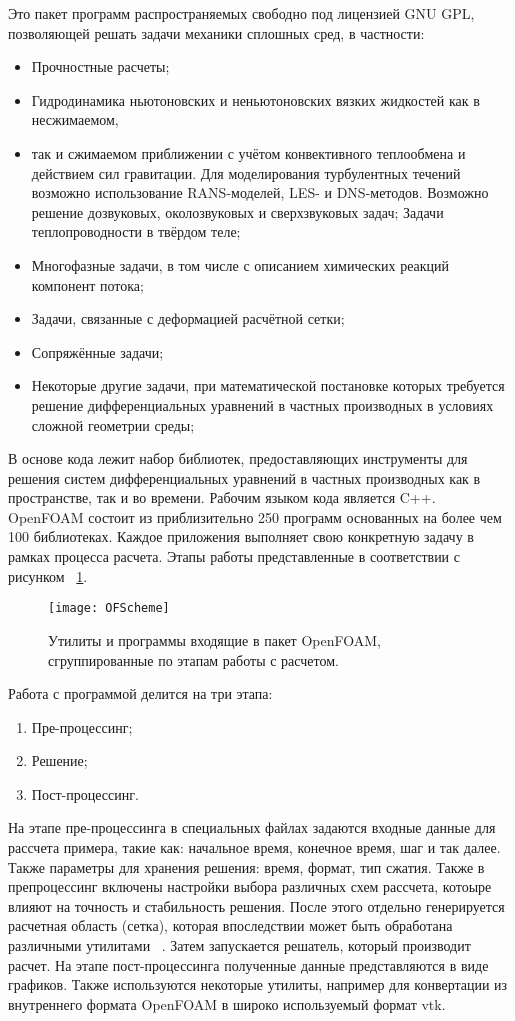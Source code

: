 \documentclass[14pt]{extreport}
\begin{document}
Это пакет программ распространяемых свободно под лицензией GNU GPL, позволяющей решать задачи механики сплошных сред, в частности: 
\begin{itemize}
\item Прочностные расчеты;
\item Гидродинамика ньютоновских и неньютоновских вязких жидкостей как в несжимаемом, \item так и сжимаемом приближении с учётом конвективного теплообмена и действием сил гравитации. Для моделирования турбулентных течений возможно использование RANS-моделей, LES- и DNS-методов. Возможно решение дозвуковых, околозвуковых и сверхзвуковых задач;
Задачи теплопроводности в твёрдом теле;
\item Многофазные задачи, в том числе с описанием химических реакций компонент потока;
\item Задачи, связанные с деформацией расчётной сетки;
\item Сопряжённые задачи;
\item Некоторые другие задачи, при математической постановке которых требуется решение дифференциальных уравнений в частных производных в условиях сложной геометрии среды;
\end{itemize}

В основе кода лежит набор библиотек, предоставляющих инструменты для решения систем дифференциальных уравнений в частных производных как в пространстве, так и во времени. Рабочим языком кода является C++. OpenFOAM состоит из приблизительно 250 программ основанных на более чем 100 библиотеках. Каждое приложения выполняет свою конкретную задачу в рамках процесса расчета. Этапы работы представленные в соответствии с рисунком ~\ref{fig1}.

\begin{figure}[H]
\centerline{\texttt{[image: OFScheme]}}
\caption{Утилиты и программы входящие в пакет OpenFOAM, сгруппированные по этапам работы с расчетом.}
\label{fig1}
\end{figure}

Работа с программой делится на три этапа:
\begin{enumerate}
\item Пре-процессинг;
\item Решение;
\item Пост-процессинг.
\end{enumerate}

На этапе пре-процессинга в специальных файлах задаются входные данные для рассчета примера, такие как: начальное время, конечное время, шаг и так далее. Также параметры для хранения решения: время, формат, тип сжатия. Также в препроцессинг включены настройки выбора различных схем рассчета, котоыре влияют на точность и стабильность решения. После этого отдельно генерируется расчетная область (сетка), которая впоследствии может быть обработана различными утилитами ~\cite{OpenfoamUserGuide}. Затем запускается решатель, который производит расчет. На этапе пост-процессинга полученные данные представляются в виде графиков. Также используются некоторые утилиты, например для конвертации из внутреннего формата OpenFOAM в широко используемый формат vtk.
\end{document}
